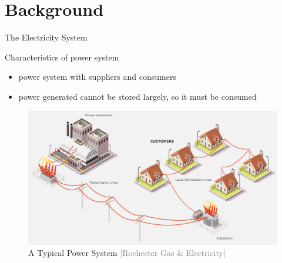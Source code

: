 \documentclass{beamer}
\begin{document}
\section{Background}
\begin{frame}{The Electricity System}
\begin{block}{Characteristics of power system}
\begin{itemize}
\item power system with suppliers and consumers
\item power generated cannot be stored largely, so it must be consumed  
\end{itemize}
\end{block}
\begin{figure}
\includegraphics[scale=0.1]{Figures/PowerSys.png}
 \caption{A Typical Power System \textcolor{gray}{\tiny[Rochester Gas \& Electricity]}}
\end{figure}

\end{frame}
\end{document}
